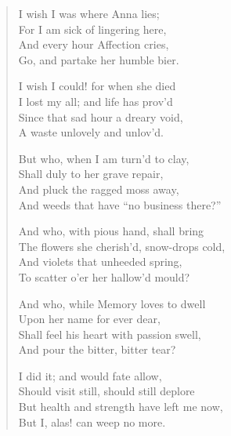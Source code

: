 \begin{verse}
  \begin{altverse}
    I wish I was where Anna lies; \\
    For I am sick of lingering here, \\
    And every hour Affection cries, \\
    Go, and partake her humble bier.
  \end{altverse}

  \begin{altverse}
    I wish I could! for when she died \\
    I lost my all; and life has prov'd \\
    Since that sad hour a dreary void, \\
    A waste unlovely and unlov'd.
  \end{altverse}

  \begin{altverse}
    But who, when I am turn'd to clay, \\
    Shall duly to her grave repair, \\
    And pluck the ragged moss away, \\
    And weeds that have ``no business there?''
  \end{altverse}

  \begin{altverse} 
    And who, with pious hand, shall bring \\
    The flowers she cherish'd, snow-drops cold, \\
    And violets that unheeded spring, \\
    To scatter o'er her hallow'd mould?
  \end{altverse}

  \begin{altverse}
    And who, while Memory loves to dwell \\
    Upon her name for ever dear, \\
    Shall feel his heart with passion swell,\\
    And pour the bitter, bitter tear?
  \end{altverse}

  \begin{altverse}
    I did it; and would fate allow, \\
    Should visit still, should still deplore\textemdash \\
    But health and strength have left me now, \\
    But I, alas! can weep no more.
  \end{altverse}


\end{verse}
